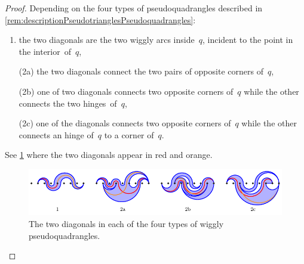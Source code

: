 \documentclass{amsart}
\theoremstyle{definition}
\begin{document}
\begin{proof}
Depending on the four types of pseudoquadrangles described in \cref{rem:descriptionPseudotrianglesPseudoquadrangles}:
\begin{enumerate}
\item the two diagonals are the two wiggly arcs inside~$q$, incident to the point in the interior~of~$q$,
\item[(2a)] the two diagonals connect the two pairs of opposite corners of~$q$,
\item[(2b)] one of two diagonals connects two opposite corners of~$q$ while the other connects the two hinges~of~$q$,
\item[(2c)] one of the diagonals connects two opposite corners of~$q$ while the other connects an hinge of~$q$ to a corner of~$q$.
\end{enumerate}
See \cref{fig:diagonalsPseudoquadrangles} where the two diagonals appear in red and orange.
%
\begin{figure}
\centerline{\includegraphics[scale=1.3]{diagonalsPseudoquadrangles}}
\caption{The two diagonals in each of the four types of wiggly pseudoquadrangles.} %
\label{fig:diagonalsPseudoquadrangles}
\end{figure}
\end{proof}
\end{document}
